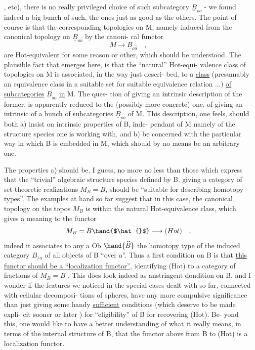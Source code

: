 
\hand{$\Delta$} ,\hand{$\square$} etc), there is no really privileged choice of such subcategory
$\underline{B}_{oo}$ - we found indeed a big bunch of such, the ones just as good as
the others. The point of course is that the corresponding topologies
on M, namely induced from the canonical topology on $\underline{B}_{oo}\hat{}$ by the canoni-%
cal functor
\[ M \longrightarrow \underline{B}_{oo}\hat{} \quad , \]
are Hot-equivalent for some reason or other, which should be understood.
The plausible fact that emerges here, is that the ``natural'' Hot-equi-%
valence class of topologies on M is associated, in the way just descri-%
bed, to a \uline{class} (presumably an equivalence class in a suitable set for
suitable equivalence relation ...) \uline{of subcategories} $\underline{B}_{oo}$ \uline{in} M. The ques-%
tion of giving an intrinsic description of the former, is apparently
reduced to the (possibly more concrete) one, of giving an intrinsic
 of a bunch of subcategories $\underline{B}_{oo}$ of M. This description,
one feels, should both a) insist on intrinsic properties of B, inde-%
pendant of M namely of the structure species one is working with, and
b) be concerned with the particular way in which B is embedded in M,
which should by no means be an arbitrary one.

The properties a) should be, I guess, no more no less than those
which express that the ``trivial'' algebraic structure species defined by
B, giving a category of set-theoretic realizations $M_B = B\hat{}$, should be
``suitable for describing homotopy types''. The examples at hand so
far suggest that in this case, the canonical topology on the topos $M_B$
is within the natural Hot-equivalence class, which gives a meaning to
the functor
\[ M_B = B\hand{$\hat{}$} \longrightarrow (Hot) \quad , \]
indeed it associates to any a \hand{$\in$} Ob $\hand{\widehat{B}}$ the homotopy type of the induced
category $B_{/a}$ of all objects of B ``over a''. Thus a first condition on
B is that \uline{this functor should be a ``localization functor''}, identifying
(Hot) to a category of fractions of $M_B = B$\hand{$\hat{}$} . This does look indeed as
anstringent dondition on B, and I wonder if the features we noticed in
the special cases dealt with so far, connected with cellular decomposi-%
tions of spheres, have any more compulsive significance than just
giving some handy \uline{sufficient} conditions (which deserve to be made expli-%
cit sooner or later \hand{!}) for ``eligibility'' of B for recovering (Hot). Be-%
yond this, one would  like to have a better understanding of what it
\uline{really} means, in terms of the internal structure of B, that the
functor above from B\hand{$\hat{}$} to (Hot) is a localization functor.
